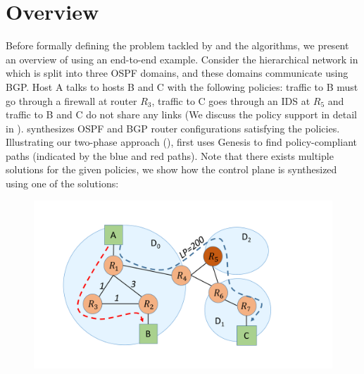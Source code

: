 \section{Overview}
Before formally defining the problem tackled by \name and the algorithms, 
we present an overview of \name using an end-to-end
example. Consider the hierarchical network in  which
is split into three OSPF domains, and these domains communicate
using BGP. Host A talks to hosts B and C with the following policies:
traffic to B must go through a firewall at router $R_3$, traffic to C 
goes through an IDS at $R_5$ and traffic 
to B and C do not share any links (We discuss the policy support in
detail in ). \name 
synthesizes OSPF and BGP router configurations satisfying the 
policies. Illustrating our two-phase approach (), 
\name first uses Genesis to find policy-compliant paths (indicated by the blue and
red paths). Note that there exists multiple solutions for the given
policies, we show how the control plane is synthesized using one of the solutions:
\begin{figure}
	\includegraphics[width=0.75\columnwidth]{figures/example.pdf}
	\label{fig:example}
\end{figure}

